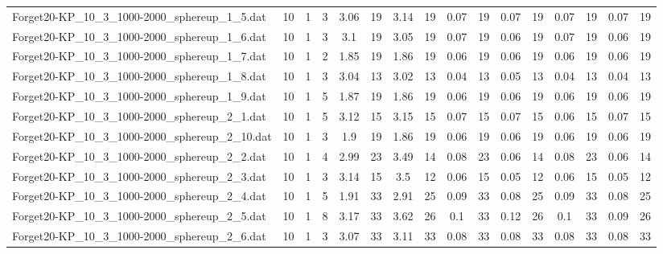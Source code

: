 \begin{sidewaystable}[!ht]
{\begin{tabular}{lccccccccccccccc}
Forget20-KP\_10\_3\_1000-2000\_sphereup\_1\_5.dat & 10 & 1 & 3 & 3.06 & 19 & 3.14 & 19 &  \textcolor{blue2}{0.07} & 19 &  \textcolor{blue2}{0.07} & 19 &  \textcolor{blue2}{0.07} & 19 &  \textcolor{blue2}{0.07} & 19 \\
Forget20-KP\_10\_3\_1000-2000\_sphereup\_1\_6.dat & 10 & 1 & 3 & 3.1 & 19 & 3.05 & 19 & 0.07 & 19 &  \textcolor{blue2}{0.06} & 19 & 0.07 & 19 &  \textcolor{blue2}{0.06} & 19 \\
Forget20-KP\_10\_3\_1000-2000\_sphereup\_1\_7.dat & 10 & 1 & 2 & 1.85 & 19 & 1.86 & 19 &  \textcolor{blue2}{0.06} & 19 &  \textcolor{blue2}{0.06} & 19 &  \textcolor{blue2}{0.06} & 19 &  \textcolor{blue2}{0.06} & 19 \\
Forget20-KP\_10\_3\_1000-2000\_sphereup\_1\_8.dat & 10 & 1 & 3 & 3.04 & 13 & 3.02 & 13 &  \textcolor{blue2}{0.04} & 13 & 0.05 & 13 &  \textcolor{blue2}{0.04} & 13 &  \textcolor{blue2}{0.04} & 13 \\
Forget20-KP\_10\_3\_1000-2000\_sphereup\_1\_9.dat & 10 & 1 & 5 & 1.87 & 19 & 1.86 & 19 &  \textcolor{blue2}{0.06} & 19 &  \textcolor{blue2}{0.06} & 19 &  \textcolor{blue2}{0.06} & 19 &  \textcolor{blue2}{0.06} & 19 \\
Forget20-KP\_10\_3\_1000-2000\_sphereup\_2\_1.dat & 10 & 1 & 5 & 3.12 & 15 & 3.15 & 15 & 0.07 & 15 & 0.07 & 15 &  \textcolor{blue2}{0.06} & 15 & 0.07 & 15 \\
Forget20-KP\_10\_3\_1000-2000\_sphereup\_2\_10.dat & 10 & 1 & 3 & 1.9 & 19 & 1.86 & 19 &  \textcolor{blue2}{0.06} & 19 &  \textcolor{blue2}{0.06} & 19 &  \textcolor{blue2}{0.06} & 19 &  \textcolor{blue2}{0.06} & 19 \\
Forget20-KP\_10\_3\_1000-2000\_sphereup\_2\_2.dat & 10 & 1 & 4 & 2.99 & 23 & 3.49 & 14 & 0.08 & 23 &  \textcolor{blue2}{0.06} & 14 & 0.08 & 23 &  \textcolor{blue2}{0.06} & 14 \\
Forget20-KP\_10\_3\_1000-2000\_sphereup\_2\_3.dat & 10 & 1 & 3 & 3.14 & 15 & 3.5 & 12 & 0.06 & 15 &  \textcolor{blue2}{0.05} & 12 & 0.06 & 15 &  \textcolor{blue2}{0.05} & 12 \\
Forget20-KP\_10\_3\_1000-2000\_sphereup\_2\_4.dat & 10 & 1 & 5 & 1.91 & 33 & 2.91 & 25 & 0.09 & 33 &  \textcolor{blue2}{0.08} & 25 & 0.09 & 33 &  \textcolor{blue2}{0.08} & 25 \\
Forget20-KP\_10\_3\_1000-2000\_sphereup\_2\_5.dat & 10 & 1 & 8 & 3.17 & 33 & 3.62 & 26 & 0.1 & 33 & 0.12 & 26 & 0.1 & 33 &  \textcolor{blue2}{0.09} & 26 \\
Forget20-KP\_10\_3\_1000-2000\_sphereup\_2\_6.dat & 10 & 1 & 3 & 3.07 & 33 & 3.11 & 33 &  \textcolor{blue2}{0.08} & 33 &  \textcolor{blue2}{0.08} & 33 &  \textcolor{blue2}{0.08} & 33 &  \textcolor{blue2}{0.08} & 33 \\

\end{tabular}}
\end{sidewaystable}
